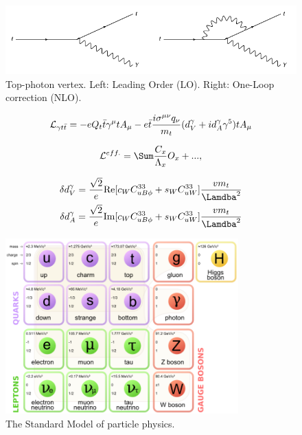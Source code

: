 \begin{figure}
\begin{center}
\includegraphics[width=\textwidth]{Figures/TopPhotonVertex.png}
\caption{Top-photon vertex. Left: Leading Order (LO). Right: One-Loop correction (NLO).}
\end{center}
\end{figure}

\begin{equation} \label{eqn-interactionlagrangian}
\mathcal{L}_{\gamma t\bar{t}} = -eQ_t\bar{t}\gamma^{\mu}tA_{\mu} - e\bar{t}\frac{i\sigma^{\mu\nu}q_{\nu}}{m_t}(d^{\gamma}_V+id^{\gamma}_A\gamma^5)tA_{\mu}
\end{equation}

\begin{equation}
\lumi^{eff.} = \Sum \frac{C_x}{\Lambda_x}O_x + ... ,
\end{equation}

\begin{align}\label{eqn-smparameterisations}
\delta d^{\gamma}_V = \frac{\sqrt{2}}{e}\text{Re}[c_WC^{33}_{uB\phi} + s_WC^{33}_{uW}]\frac{vm_t}{\Lamdba^2} \\
\delta d^{\gamma}_A = \frac{\sqrt{2}}{e}\text{Im}[c_WC^{33}_{uB\phi} + s_WC^{33}_{uW}]\frac{vm_t}{\Lamdba^2}
\end{align}

\begin{figure}
\begin{center}
\includegraphics[width=0.8\textwidth]{Figures/StandardModel.png}
\caption{The Standard Model of particle physics.}
\end{center}
\end{figure}

